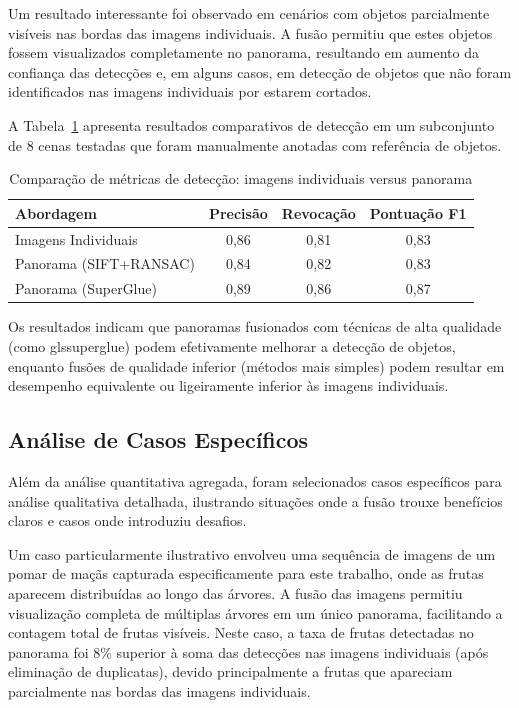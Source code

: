 Um resultado interessante foi observado em cenários com objetos parcialmente visíveis nas bordas das imagens individuais. A fusão permitiu que estes objetos fossem visualizados completamente no panorama, resultando em aumento da confiança das detecções e, em alguns casos, em detecção de objetos que não foram identificados nas imagens individuais por estarem cortados.

A Tabela~\ref{tab:deteccao_comparativa} apresenta resultados comparativos de detecção em um subconjunto de 8 cenas testadas que foram manualmente anotadas com referência de objetos.

\begin{table}[htb]
\centering
\caption{Comparação de métricas de detecção: imagens individuais versus panorama}
\label{tab:deteccao_comparativa}
\begin{tabular}{lccc}
\hline
\textbf{Abordagem} & \textbf{Precisão} & \textbf{Revocação} & \textbf{Pontuação F1} \\
\hline
Imagens Individuais & 0,86 & 0,81 & 0,83 \\
Panorama (SIFT+RANSAC) & 0,84 & 0,82 & 0,83 \\
Panorama (SuperGlue) & 0,89 & 0,86 & 0,87 \\
\hline
\end{tabular}
\end{table}

Os resultados indicam que panoramas fusionados com técnicas de alta qualidade (como gls{superglue}) podem efetivamente melhorar a detecção de objetos, enquanto fusões de qualidade inferior (métodos mais simples) podem resultar em desempenho equivalente ou ligeiramente inferior às imagens individuais.

\subsection{Análise de Casos Específicos}

Além da análise quantitativa agregada, foram selecionados casos específicos para análise qualitativa detalhada, ilustrando situações onde a fusão trouxe benefícios claros e casos onde introduziu desafios.

Um caso particularmente ilustrativo envolveu uma sequência de imagens de um pomar de maçãs capturada especificamente para este trabalho, onde as frutas aparecem distribuídas ao longo das árvores. A fusão das imagens permitiu visualização completa de múltiplas árvores em um único panorama, facilitando a contagem total de frutas visíveis. Neste caso, a taxa de frutas detectadas no panorama foi 8\% superior à soma das detecções nas imagens individuais (após eliminação de duplicatas), devido principalmente a frutas que apareciam parcialmente nas bordas das imagens individuais.


